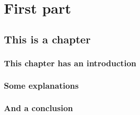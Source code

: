 \part{First part}
\chapter{This is a chapter}
\minitoc %
\section{This chapter has an introduction}
\section{Some explanations}
\section{And a conclusion}